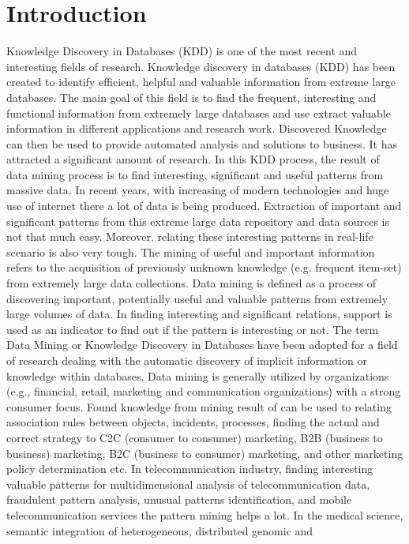 \documentclass[conference]{IEEEtran}
\begin{document}




%
\IEEEpeerreviewmaketitle


\section{Introduction}

Knowledge Discovery in Databases (KDD) is one of the most recent and interesting fields of research. Knowledge discovery in databases (KDD) has been created to identify efficient, helpful and valuable information from extreme large databases. The main goal of this field is to find the frequent, interesting and functional information from extremely large databases and use extract valuable information in different applications and research work. Discovered Knowledge can then be used to provide automated analysis and solutions to business. It has attracted a significant amount of research. In this KDD process, the result of data mining process is to find interesting, significant and useful patterns from massive data. In recent years, with increasing of modern technologies and huge use of internet there a lot of data is being produced. Extraction of important and significant patterns from this extreme large data repository and data sources is not that much easy. Moreover. relating these interesting patterns in real-life scenario is also very tough. The mining of useful and important information refers to the acquisition of previously unknown knowledge (e.g. frequent item-set) from extremely large data collections. Data mining is defined as a process of discovering important, potentially useful and valuable patterns from extremely large volumes of data. In finding interesting and significant relations, support is used as an indicator to find out if the pattern is interesting or not. The term Data Mining or Knowledge Discovery in Databases have been adopted for a field of research dealing with the automatic discovery of implicit information or knowledge within databases. Data mining is generally utilized by organizations (e.g., financial, retail, marketing and communication organizations) with a strong consumer focus. Found knowledge from mining result of can be used to relating association rules between objects, incidents, processes, finding the actual and correct strategy to C2C (consumer to consumer) marketing, B2B (business to business) marketing, B2C (business to consumer) marketing, and other marketing policy determination etc. In telecommunication industry, finding interesting valuable patterns for multidimensional analysis of telecommunication data, fraudulent pattern analysis, unusual patterns identification, and mobile telecommunication services the pattern mining helps a lot. In the medical science, semantic integration of heterogeneous, distributed genomic and 
\end{document}
